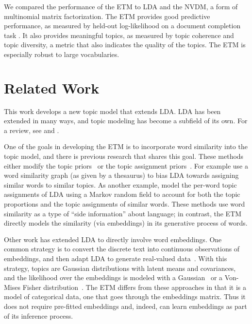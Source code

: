 \documentclass[11pt,a4paper]{article}
\begin{document}
We compared the performance of the \gls{ETM} to \gls{LDA} and the
\gls{NVDM}, a form of multinomial matrix factorization.  The \gls{ETM}
provides good predictive performance, as measured by held-out
log-likelihood on a document completion task
\citep{wallach2009evaluation}. It also provides meaningful topics, as
measured by topic coherence \citep{mimno2011optimizing} and topic
diversity, a metric that also indicates the quality of the topics.
The \gls{ETM} is especially robust to large vocabularies.




 \section{Related Work}
\label{sec:related}

This work develops a new topic model that extends \gls{LDA}.
\gls{LDA} has been extended in many ways, and topic modeling has
become a subfield of its own.  For a review, see
\citet{blei2012probabilistic} and \citet{boydgraber2017applications}.

One of the goals in developing the \gls{ETM} is to incorporate word
similarity into the topic model, and there is previous research that
shares this goal.  These methods either modify the topic
priors~\citep{petterson2010word, zhao2017metalda, shi2017jointly,
  zhao2017word} or the topic assignment
priors~\citep{xie2015incorporating}. For example
\citet{petterson2010word} use a word similarity graph (as given by a
thesaurus) to bias \gls{LDA} towards assigning similar words to
similar topics. As another example, \citet{xie2015incorporating} model
the per-word topic assignments of \gls{LDA} using a Markov random
field to account for both the topic proportions and the topic
assignments of similar words.  These methods use word
similarity as a type of ``side information'' about language; in
contrast, the \gls{ETM} directly models the similarity (via
embeddings) in its generative process of words.


Other work has extended \gls{LDA} to directly involve word embeddings.
One common strategy is to convert the discrete text into continuous
observations of embeddings, and then adapt \gls{LDA} to generate
real-valued data~\citep{das2015gaussian, xun2016topic,
  batmanghelich2016nonparametric, xun2017correlated}.  With this
strategy, topics are Gaussian distributions with latent means and
covariances, and the likelihood over the embeddings is modeled with a
Gaussian~\citep{das2015gaussian} or a Von-Mises Fisher
distribution~\citep{batmanghelich2016nonparametric}.  The \gls{ETM}
differs from these approaches in that it is a model of categorical
data, one that goes through the embeddings matrix.  Thus it does not
require pre-fitted embeddings and, indeed, can learn embeddings as
part of its inference process.
\end{document}
